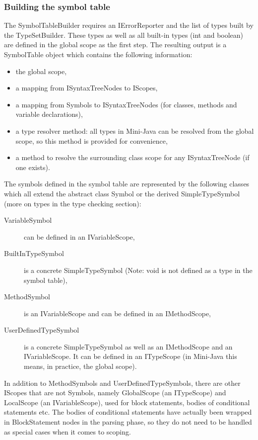 \documentclass[a4paper,11pt]{article}
\begin{document}
\subsubsection{Building the symbol table}

The SymbolTableBuilder requires an IErrorReporter and the list of types built by the TypeSetBuilder. These types as well as all built-in types (int and boolean) are defined in the global scope as the first step. The resulting output is a SymbolTable object which contains the following information:

\begin{itemize}
\item the global scope,
\item a mapping from ISyntaxTreeNodes to IScopes,
\item a mapping from Symbols to ISyntaxTreeNodes (for classes, methods and variable declarations),
\item a type resolver method: all types in Mini-Java can be resolved from the global scope, so this method is provided for convenience,
\item a method to resolve the surrounding class scope for any ISyntaxTreeNode (if one exists).
\end{itemize}

The symbols defined in the symbol table are represented by the following classes which all extend the abstract class Symbol or the derived SimpleTypeSymbol (more on types in the type checking section):

\begin{description}
\item[VariableSymbol] can be defined in an IVariableScope,
\item[BuiltInTypeSymbol] is a concrete SimpleTypeSymbol (Note: void is not defined as a type in the symbol table),
\item[MethodSymbol] is an IVariableScope and can be defined in an IMethodScope,
\item[UserDefinedTypeSymbol] is a concrete SimpleTypeSymbol as well as an IMethodScope and an IVariableScope. It can be defined in an ITypeScope (in Mini-Java this means, in practice, the global scope).
\end{description}

In addition to MethodSymbols and UserDefinedTypeSymbols, there are other IScopes that are not Symbols, namely GlobalScope (an ITypeScope) and LocalScope (an IVariableScope), used for block statements, bodies of conditional statements etc. The bodies of conditional statements have actually been wrapped in BlockStatement nodes in the parsing phase, so they do not need to be handled as special cases when it comes to scoping.
\end{document}
